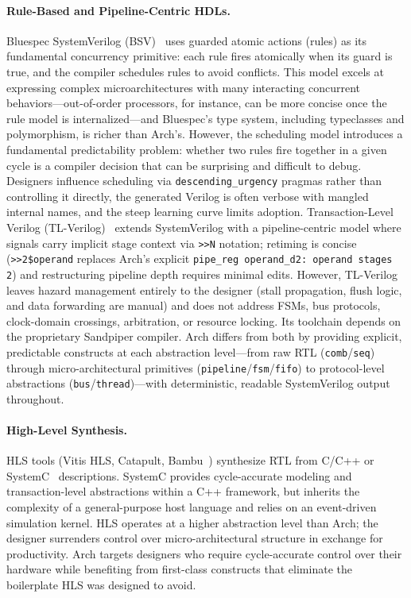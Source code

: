 \documentclass[manuscript]{acmart}
\begin{document}
\paragraph{Rule-Based and Pipeline-Centric HDLs.}
Bluespec SystemVerilog (BSV)~\cite{bluespec} uses guarded atomic actions (rules) as its fundamental concurrency primitive: each rule fires atomically when its guard is true, and the compiler schedules rules to avoid conflicts. This model excels at expressing complex microarchitectures with many interacting concurrent behaviors---out-of-order processors, for instance, can be more concise once the rule model is internalized---and Bluespec's type system, including typeclasses and polymorphism, is richer than Arch's. However, the scheduling model introduces a fundamental predictability problem: whether two rules fire together in a given cycle is a compiler decision that can be surprising and difficult to debug. Designers influence scheduling via \texttt{descending\_urgency} pragmas rather than controlling it directly, the generated Verilog is often verbose with mangled internal names, and the steep learning curve limits adoption. Transaction-Level Verilog (TL-Verilog)~\cite{tlverilog} extends SystemVerilog with a pipeline-centric model where signals carry implicit stage context via \texttt{>>N} notation; retiming is concise (\texttt{>>2\$operand} replaces Arch's explicit \texttt{pipe\_reg operand\_d2: operand stages 2}) and restructuring pipeline depth requires minimal edits. However, TL-Verilog leaves hazard management entirely to the designer (stall propagation, flush logic, and data forwarding are manual) and does not address FSMs, bus protocols, clock-domain crossings, arbitration, or resource locking. Its toolchain depends on the proprietary Sandpiper compiler. Arch differs from both by providing explicit, predictable constructs at each abstraction level---from raw RTL (\texttt{comb}/\texttt{seq}) through micro-architectural primitives (\texttt{pipeline}/\texttt{fsm}/\texttt{fifo}) to protocol-level abstractions (\texttt{bus}/\texttt{thread})---with deterministic, readable SystemVerilog output throughout.

\paragraph{High-Level Synthesis.}
HLS tools (Vitis HLS, Catapult, Bambu~\cite{bambu}) synthesize RTL from C/C++ or SystemC~\cite{systemc} descriptions. SystemC provides cycle-accurate modeling and transaction-level abstractions within a C++ framework, but inherits the complexity of a general-purpose host language and relies on an event-driven simulation kernel. HLS operates at a higher abstraction level than Arch; the designer surrenders control over micro-architectural structure in exchange for productivity. Arch targets designers who require cycle-accurate control over their hardware while benefiting from first-class constructs that eliminate the boilerplate HLS was designed to avoid.
\end{document}
